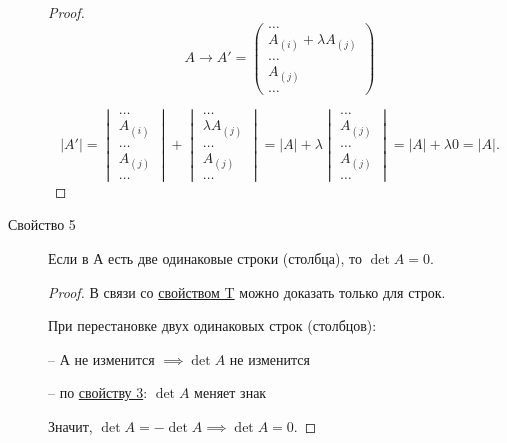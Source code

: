 \begin{description}
\begin{proof}
        \begin{equation*}
            A \to A' = \begin{pmatrix}
                \dots \\ A_{(i)} + \lambda A_{(j)} \\ \dots \\ A_{(j)} \\ \dots
            \end{pmatrix}
        \end{equation*}

        \begin{equation*}
            |A'| = \begin{vmatrix}
                \dots \\ A_{(i)} \\ \dots \\ A_{(j)} \\ \dots
            \end{vmatrix} + \begin{vmatrix}
                \dots \\ \lambda A_{(j)} \\ \dots \\ A_{(j)} \\ \dots
            \end{vmatrix} = |A| + \lambda \begin{vmatrix}
                \dots \\ A_{(j)} \\ \dots \\ A_{(j)} \\ \dots
            \end{vmatrix} = |A| + \lambda 0 = |A|
        .\end{equation*}
    \end{proof}

\item[Свойство 5\label{det:prop_5}]
    Если в А есть две одинаковые строки (столбца), то $\det A = 0$.
    \begin{proof}
        В связи со \hyperref[det:prop_t]{свойством T} можно доказать только для строк.

        При перестановке двух одинаковых строк (столбцов):

        -- А не изменится $\implies \det A$ не изменится

        -- по \hyperref[det:prop_3]{свойству 3}: $\det A$ меняет знак

        Значит, $\det A = -\det A \implies \det A = 0$.
    \end{proof}
\end{description}

